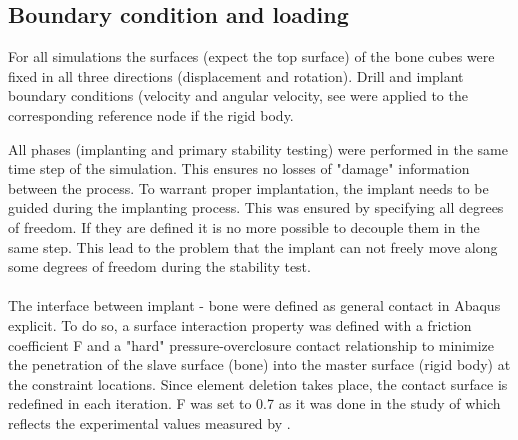 \documentclass[12pt, a4paper, twoside]{report}
\begin{document}
\subsection{Boundary condition and loading}
%
%
For all simulations the surfaces (expect the top surface) of the bone cubes were fixed in all three directions (displacement and rotation). Drill and implant boundary conditions (velocity and angular velocity, see were applied to the corresponding reference node if the rigid body.
%
\begin{table}[H]
\caption{Boundary conditions of implanting and primary stability test of G1, G2 and G3.}
\label{tab:drillprotocolsGNS}
\end{table}
%
All phases (implanting and primary stability testing) were performed in the same time step of the simulation. This ensures no losses of "damage" information between the process. To warrant proper implantation, the implant needs to be guided during the implanting process. This was ensured by specifying all degrees of freedom. If they are defined it is no more possible to decouple them in the same step. This lead to the problem that the implant can not freely move along some degrees of freedom during the stability test.\\
%
\\
The interface between implant - bone were defined as general contact in Abaqus explicit. To do so, a surface interaction property was defined with a friction coefficient F and a "hard" pressure-overclosure contact relationship to minimize the penetration of the slave surface (bone) into the master surface (rigid body) at the constraint locations. Since element deletion takes place, the contact surface is redefined in each iteration. F was set to 0.7 as it was done in the study of \cite{Ovesy_2019_JMechBehavBiomedMater} which 
reflects the experimental values measured by \cite{Voutat_2019_Biotribology}.
%
%
%
%
\end{document}
